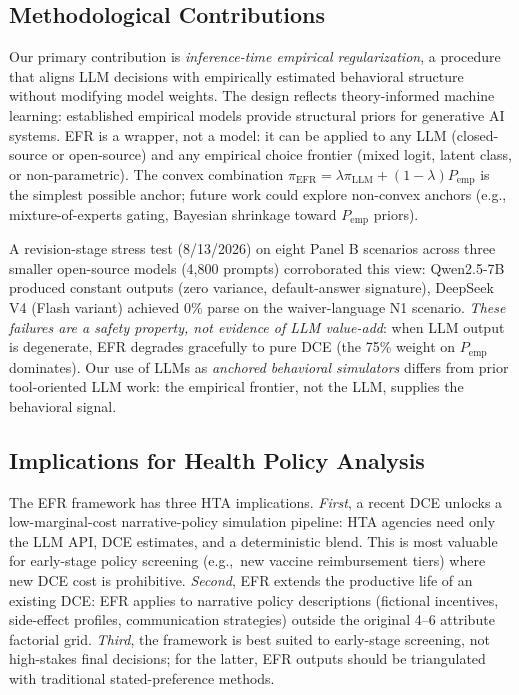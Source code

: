 \documentclass[11pt]{article}
\begin{document}
\subsection{Methodological Contributions}

Our primary contribution is \emph{inference-time empirical regularization}, a procedure that aligns LLM decisions with empirically estimated behavioral structure without modifying model weights. The design reflects theory-informed machine learning: established empirical models provide structural priors for generative AI systems. EFR is a wrapper, not a model: it can be applied to any LLM (closed-source or open-source) and any empirical choice frontier (mixed logit, latent class, or non-parametric). The convex combination $\pi_{\mathrm{EFR}} = \lambda \pi_{\mathrm{LLM}} + (1-\lambda) P_{\mathrm{emp}}$ is the simplest possible anchor; future work could explore non-convex anchors (e.g., mixture-of-experts gating, Bayesian shrinkage toward $P_{\mathrm{emp}}$ priors).

A revision-stage stress test (8/13/2026) on eight Panel B scenarios across three smaller open-source models (4,800 prompts) corroborated this view: Qwen2.5-7B produced constant outputs (zero variance, default-answer signature), DeepSeek V4 (Flash variant) achieved 0\% parse on the waiver-language N1 scenario. \emph{These failures are a safety property, not evidence of LLM value-add}: when LLM output is degenerate, EFR degrades gracefully to pure DCE (the 75\% weight on $P_{\text{emp}}$ dominates). Our use of LLMs as \emph{anchored behavioral simulators} differs from prior tool-oriented LLM work: the empirical frontier, not the LLM, supplies the behavioral signal.

\subsection{Implications for Health Policy Analysis}
\label{sec:impl_policy}

The EFR framework has three HTA implications. \emph{First}, a recent DCE unlocks a low-marginal-cost narrative-policy simulation pipeline: HTA agencies need only the LLM API, DCE estimates, and a deterministic blend. This is most valuable for early-stage policy screening (e.g.,\ new vaccine reimbursement tiers) where new DCE cost is prohibitive. \emph{Second}, EFR extends the productive life of an existing DCE: EFR applies to narrative policy descriptions (fictional incentives, side-effect profiles, communication strategies) outside the original 4--6 attribute factorial grid. \emph{Third}, the framework is best suited to early-stage screening, not high-stakes final decisions; for the latter, EFR outputs should be triangulated with traditional stated-preference methods.
\end{document}

